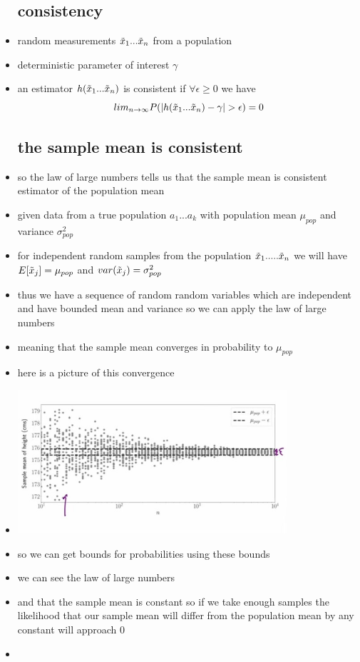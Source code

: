\documentclass{article}
\begin{document}
\begin{itemize}
\subsection{consistency}
\item random measurements $\Tilde{x}_1...\Tilde{x}_n$ from a population 
\item deterministic parameter of interest $\gamma$
\item an estimator $h(\Tilde{x}_1...\Tilde{x}_n)$ is consistent if  $\forall \epsilon\geq 0$ we have $$lim_{n\rightarrow \infty} P(|h(\Tilde{x}_1...\Tilde{x}_n) -\gamma|>\epsilon)=0$$
\subsection{the sample mean is consistent }
\item so the law of large numbers tells us that the sample mean is consistent estimator of the population mean 
\item given data from a true population  $a_1...a_k$
with population mean $\mu_{pop}$ and variance $\sigma^2_{pop}$
\item for independent random samples from the population $\Tilde{x}_1.....\Tilde{x}_n$ 
we  will have  $E[\Tilde{x}_{j}]=\mu_{pop}$ and $var(\Tilde{x}_{j})=\sigma^2_{pop}$
\item thus we have a sequence of random random variables which are independent and have bounded mean and variance so we can apply the law of large numbers 
\item meaning that the sample mean converges in probability to $\mu_{pop}$
\item here is a picture of this convergence \item\includegraphics[width=10cm]{notes/week_3/Video 3:The Law of Large Numbers and Deviation Inequalities/immages/v_3_1.jpg}
\item so we can get bounds for probabilities using these bounds
\item we can see the law of large numbers 
\item and that the sample mean is constant so if we take enough samples the likelihood that our sample mean will differ from the population mean by any constant will approach 0
\item 
\end{itemize}
\end{document}
